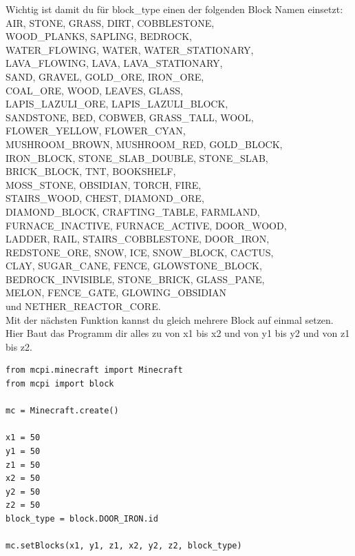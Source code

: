  Wichtig ist damit du für block\_type einen der folgenden Block Namen einsetzt:
 AIR, STONE, GRASS, DIRT, COBBLESTONE, \\
 WOOD\_PLANKS, SAPLING, BEDROCK, \\
 WATER\_FLOWING, WATER, WATER\_STATIONARY,\\
 LAVA\_FLOWING, LAVA, LAVA\_STATIONARY,\\
 SAND, GRAVEL, GOLD\_ORE, IRON\_ORE, \\
 COAL\_ORE, WOOD, LEAVES, GLASS, \\
 LAPIS\_LAZULI\_ORE, LAPIS\_LAZULI\_BLOCK, \\
 SANDSTONE, BED, COBWEB, GRASS\_TALL, WOOL, \\
 FLOWER\_YELLOW, FLOWER\_CYAN, \\
 MUSHROOM\_BROWN, MUSHROOM\_RED, GOLD\_BLOCK, \\
 IRON\_BLOCK, STONE\_SLAB\_DOUBLE, STONE\_SLAB,\\
  BRICK\_BLOCK, TNT, BOOKSHELF,\\
 MOSS\_STONE, OBSIDIAN, TORCH, FIRE, \\
 STAIRS\_WOOD, CHEST, DIAMOND\_ORE, \\
 DIAMOND\_BLOCK, CRAFTING\_TABLE, FARMLAND, \\
 FURNACE\_INACTIVE, FURNACE\_ACTIVE, DOOR\_WOOD, \\
 LADDER, RAIL, STAIRS\_COBBLESTONE, DOOR\_IRON, \\
 REDSTONE\_ORE, SNOW, ICE, SNOW\_BLOCK, CACTUS, \\
 CLAY, SUGAR\_CANE, FENCE, GLOWSTONE\_BLOCK, \\
 BEDROCK\_INVISIBLE, STONE\_BRICK, GLASS\_PANE, \\
 MELON, FENCE\_GATE, GLOWING\_OBSIDIAN \\
 und NETHER\_REACTOR\_CORE.\\
 
 Mit der nächsten Funktion kannst du gleich mehrere Block auf einmal setzen. Hier Baut das Programm dir alles zu von x1 bis x2 und von y1 bis y2 und von z1 bis z2.

\lstset{language=Python}
\lstset{frame=lines}
\lstset{basicstyle=\footnotesize}
\begin{lstlisting}
from mcpi.minecraft import Minecraft
from mcpi import block

mc = Minecraft.create()

x1 = 50
y1 = 50
z1 = 50
x2 = 50
y2 = 50
z2 = 50
block_type = block.DOOR_IRON.id

mc.setBlocks(x1, y1, z1, x2, y2, z2, block_type)
\end{lstlisting}

